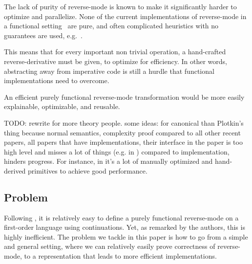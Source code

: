 The lack of purity of reverse-mode is known to make it significantly harder to optimize and parallelize. 
None of the current implementations of reverse-mode in a functional setting~\cite{lantern_icfp,pearlmutter2008reverse,baydin2016diffsharp} are pure, and often complicated heuristics with no guarantees are used, e.g.~\cite{xla}.

This means that for every important non trivial operation, a hand-crafted reverse-derivative must be given, to optimize for efficiency.
In other words, abstracting away from imperative code is still a hurdle that functional implementations need to overcome.

An efficient purely functional reverse-mode transformation would be more easily explainable, optimizable, and reusable.

TODO: rewrite for more theory people. some ideas: for canonical than Plotkin's thing because normal semantics, complexity proof compared to all other recent papers, 
all papers that have implementations, their interface in the paper is too high level and misses a lot of things (e.g. in \cite{vytiniotis2019differentiable,lantern_icfp,sherman2021}) compared to implementation, hinders progress. 
For instance, in \cite{lantern_icfp} it's a lot of manually optimized and hand-derived primitives to achieve good performance. 

\subsection{Problem}

Following \cite{pearlmutter2008reverse}, it is relatively easy to define a purely functional reverse-mode on a first-order language using continuations. 
Yet, as remarked by the authors, this is highly inefficient. 
The problem we tackle in this paper is how to go from a simple and general setting, where we can relatively easily prove correctness of reverse-mode, 
to a representation that leads to more efficient implementations.

